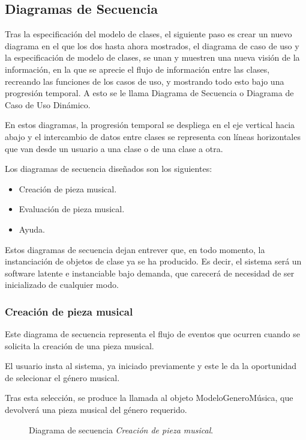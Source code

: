 
\subsection{Diagramas de Secuencia}

Tras la especificación del modelo de clases, el siguiente paso es crear un nuevo diagrama en el que los dos hasta ahora mostrados, el diagrama de caso de uso y la especificación de modelo de clases, se unan y muestren una nueva visión de la información, en la que se aprecie el flujo de información entre las clases, recreando las funciones de los casos de uso, y mostrando todo esto bajo una progresión temporal. A esto se le llama Diagrama de Secuencia o Diagrama de Caso de Uso Dinámico.

En estos diagramas, la progresión temporal se despliega en el eje vertical hacia abajo y el intercambio de datos entre clases se representa con líneas horizontales que van desde un usuario a una clase o de una clase a otra.

Los diagramas de secuencia diseñados son los siguientes:

\begin{itemize}
    \item Creación de pieza musical.
    \item Evaluación de pieza musical.
    \item Ayuda.
\end{itemize}

Estos diagramas de secuencia dejan entrever que, en todo momento, la instanciación de objetos de clase ya se ha producido. Es decir, el sistema será un software latente e instanciable bajo demanda, que carecerá de necesidad de ser inicializado de cualquier modo.

\newpage
\subsubsection{Creación de pieza musical}

Este diagrama de secuencia representa el flujo de eventos que ocurren cuando se solicita la creación de una pieza musical.

El usuario insta al sistema, ya iniciado previamente y este le da la oportunidad de selecionar el género musical.

Tras esta selección, se produce la llamada al objeto ModeloGeneroMúsica, que devolverá una pieza musical del género requerido.

\begin{figure}[H]
  \centering
  
  \caption{Diagrama de secuencia \emph{Creación de pieza musical}.}
\end{figure}

